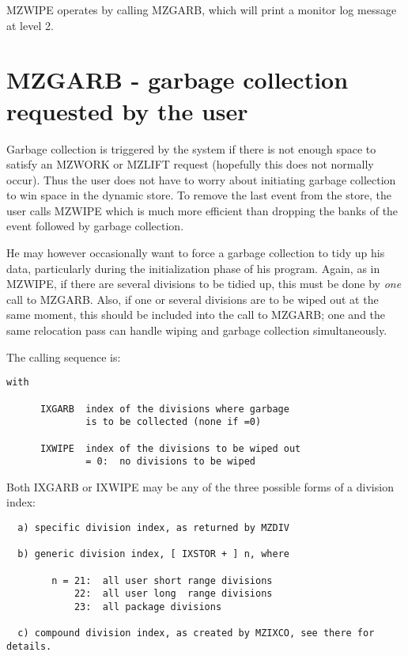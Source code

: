 MZWIPE operates by calling MZGARB, which will print a monitor
log message at level 2.

\section{MZGARB - garbage collection requested by the user}

Garbage collection is triggered by the system if there is not
enough space to satisfy an MZWORK or MZLIFT request
(hopefully this does not normally occur).
Thus the user does not have to worry about initiating
garbage collection to win space in the dynamic store.
To remove the last event from the store,
the user calls MZWIPE which is much more efficient
than dropping the banks of the event followed by garbage collection.

He may however occasionally want to force a garbage collection
to tidy up his data,
particularly during the initialization phase of his program.
Again, as in MZWIPE, if there are several divisions to be tidied up,
this must be done by {\em one} call to MZGARB.
Also,
if one or several divisions are to be wiped out at the same moment,
this should be included into the call to MZGARB;
one and the same relocation pass can handle wiping
and garbage collection simultaneously.

The calling sequence is:

\begin{verbatim}
with

      IXGARB  index of the divisions where garbage
              is to be collected (none if =0)

      IXWIPE  index of the divisions to be wiped out
              = 0:  no divisions to be wiped
\end{verbatim} 

Both IXGARB or IXWIPE may be any of the three possible forms
of a division index:
\begin{verbatim}
  a) specific division index, as returned by MZDIV

  b) generic division index, [ IXSTOR + ] n, where

        n = 21:  all user short range divisions
            22:  all user long  range divisions
            23:  all package divisions

  c) compound division index, as created by MZIXCO, see there for details.
\end{verbatim} 

